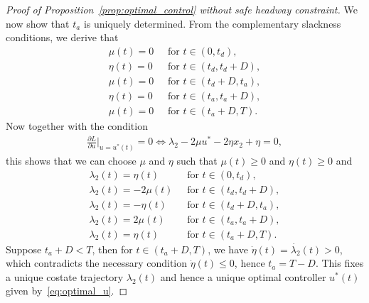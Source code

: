 \documentclass[a4paper]{article}
\theoremstyle{definition}
\theoremstyle{plain}
\begin{document}
\begin{proof}[Proof of Proposition~\ref{prop:optimal_control} without safe
  headway constraint]
We now show that $t_{a}$ is uniquely determined.
%
From the complementary slackness conditions, we derive that
\begin{align*}
  \mu(t) = 0 \; & \text{ for } t \in (0, t_{d}) , \\
  \eta(t) = 0 \;& \text{ for } t \in (t_{d}, t_{d} + D) , \\
  \mu(t) = 0 \; & \text{ for } t \in (t_{d} + D, t_{a}) , \\
  \eta(t) = 0 \;& \text{ for } t \in (t_{a}, t_{a} + D) , \\
  \mu(t) = 0 \; & \text{ for } t \in (t_{a} + D, T) .
\end{align*}
%
Now together with the condition
\begin{align*}
  \frac{\partial L}{\partial u} |_{u=u^{*}(t)} = 0 \iff \lambda_{2} - 2 \mu u^{*} - 2 \eta x_{2} + \eta = 0 ,
\end{align*}
this shows that we can choose $\mu$ and $\eta$ such that $\mu(t) \geq 0$ and $\eta(t) \geq 0$ and
\begin{align*}
  \lambda_{2}(t) = \eta(t) \; & \text{ for } t \in (0, t_{d}) , \\
  \lambda_{2}(t) = -2 \mu(t) \; & \text{ for } t \in (t_{d}, t_{d} + D) , \\
  \lambda_{2}(t) = -\eta(t) \; & \text{ for } t \in (t_{d} + D, t_{a}) , \\
  \lambda_{2}(t) = 2 \mu(t) \; & \text{ for } t \in (t_{a}, t_{a} + D) , \\
  \lambda_{2}(t) = \eta(t) \;& \text{ for } t \in (t_{a} + D, T) .
\end{align*}
%
Suppose $t_{a} + D < T$, then for $t \in (t_{a} + D, T)$, we have
$\dot{\eta}(t) = \dot{\lambda_{2}}(t) > 0$, which contradicts the necessary
condition $\dot{\eta}(t) \leq 0$, hence $t_{a}= T - D$. This fixes a unique
costate trajectory $\lambda_{2}(t)$ and hence a unique optimal controller
$u^{*}(t)$ given by~\eqref{eq:optimal_u}.
\end{proof}
\end{document}
